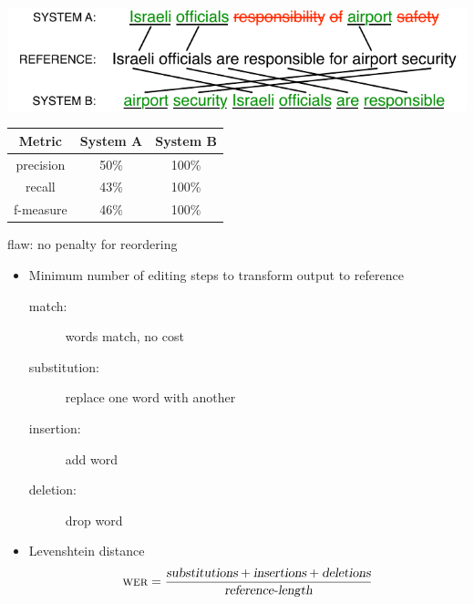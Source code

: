 \documentclass[landscape]{slides}
\newcommand{\maths}[1]{\textcolor{purple}{#1}}
\begin{document}

\vspace{5mm}
\begin{center}
\includegraphics[scale=2]{word-error-rate2.pdf}

\vspace{10mm}
\begin{tabular}{c|c|c}
\bf Metric & \bf System A & \bf System B \\ \hline 
precision & 50\% & 100\% \\ \hline
recall & 43\% & 100\% \\ \hline
f-measure & 46\% & 100\% \\ \hline
\end{tabular}
\vspace{10mm}

flaw: no penalty for reordering
\end{center}



\vspace{10mm}
\begin{itemize}
\item Minimum number of editing steps to transform output to reference
\begin{description}
\item[match:] words match, no cost
\item[substitution:] replace one word with another
\item[insertion:] add word
\item[deletion:] drop word
\end{description}
\item Levenshtein distance
\maths{\begin{equation*}
\text{{\sc wer}} = \frac{\text{\em substitutions} + \text{\em insertions} + \text{\em deletions}}{\text{\em reference-length}}
\end{equation*}}
\end{itemize}

\end{document}
